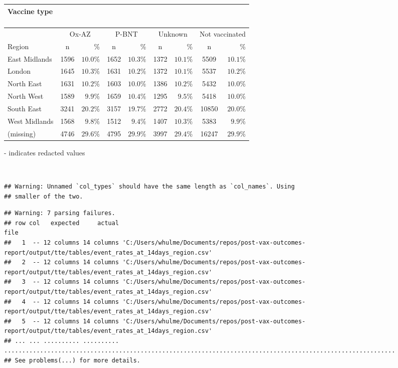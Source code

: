 \documentclass[
]{article}
\begin{document}
\captionsetup[table]{labelformat=empty,skip=1pt}
\begin{longtable}{lcrcrcrcr}
\caption*{
\large Vaccine type\\ 
\small \\ 
} \\ 
\toprule
& \multicolumn{2}{c}{Ox-AZ} & \multicolumn{2}{c}{P-BNT} & \multicolumn{2}{c}{Unknown} & \multicolumn{2}{c}{Not vaccinated} \\ 
 \cmidrule(lr){2-3}\cmidrule(lr){4-5}\cmidrule(lr){6-7}\cmidrule(lr){8-9}
Region & n & \% & n & \% & n & \% & n & \% \\ 
\midrule
East Midlands & 1596 & $10.0\%$ & 1652 & $10.3\%$ & 1372 & $10.1\%$ & 5509 & $10.1\%$ \\ 
London & 1645 & $10.3\%$ & 1631 & $10.2\%$ & 1372 & $10.1\%$ & 5537 & $10.2\%$ \\ 
North East & 1631 & $10.2\%$ & 1603 & $10.0\%$ & 1386 & $10.2\%$ & 5432 & $10.0\%$ \\ 
North West & 1589 & $9.9\%$ & 1659 & $10.4\%$ & 1295 & $9.5\%$ & 5418 & $10.0\%$ \\ 
South East & 3241 & $20.2\%$ & 3157 & $19.7\%$ & 2772 & $20.4\%$ & 10850 & $20.0\%$ \\ 
West Midlands & 1568 & $9.8\%$ & 1512 & $9.4\%$ & 1407 & $10.3\%$ & 5383 & $9.9\%$ \\ 
(missing) & 4746 & $29.6\%$ & 4795 & $29.9\%$ & 3997 & $29.4\%$ & 16247 & $29.9\%$ \\ 
\bottomrule
\end{longtable}
\begin{minipage}{\linewidth}
- indicates redacted values\\ 
\end{minipage}

~ ~

\begin{verbatim}
## Warning: Unnamed `col_types` should have the same length as `col_names`. Using
## smaller of the two.
\end{verbatim}

\begin{verbatim}
## Warning: 7 parsing failures.
## row col   expected     actual                                                                                                          file
##   1  -- 12 columns 14 columns 'C:/Users/whulme/Documents/repos/post-vax-outcomes-report/output/tte/tables/event_rates_at_14days_region.csv'
##   2  -- 12 columns 14 columns 'C:/Users/whulme/Documents/repos/post-vax-outcomes-report/output/tte/tables/event_rates_at_14days_region.csv'
##   3  -- 12 columns 14 columns 'C:/Users/whulme/Documents/repos/post-vax-outcomes-report/output/tte/tables/event_rates_at_14days_region.csv'
##   4  -- 12 columns 14 columns 'C:/Users/whulme/Documents/repos/post-vax-outcomes-report/output/tte/tables/event_rates_at_14days_region.csv'
##   5  -- 12 columns 14 columns 'C:/Users/whulme/Documents/repos/post-vax-outcomes-report/output/tte/tables/event_rates_at_14days_region.csv'
## ... ... .......... .......... .............................................................................................................
## See problems(...) for more details.
\end{verbatim}
\end{document}
